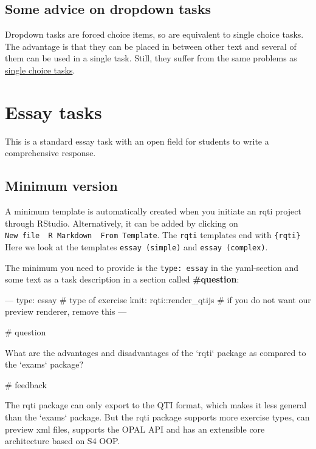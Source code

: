 \documentclass[twoside]{tufte-book}
\newenvironment{Shaded}{}{}
\begin{document}
\section{Some advice on dropdown tasks}\label{some-advice-on-dropdown-tasks}

Dropdown tasks are forced choice items, so are equivalent to single choice tasks. The advantage is that they can be placed in between other text and several of them can be used in a single task. Still, they suffer from the same problems as \href{singlechoice.html}{single choice tasks}.

\chapter{Essay tasks}\label{essay-tasks}

This is a standard essay task with an open field for students to write a comprehensive response.

\section{Minimum version}\label{minimum-version-4}

A minimum template is automatically created when you initiate an rqti project through RStudio. Alternatively, it can be added by clicking on \texttt{New\ file\ \textrightarrow{}\ R\ Markdown\ \textrightarrow{}\ From\ Template}. The \texttt{rqti} templates end with \texttt{\{rqti\}} Here we look at the templates \texttt{essay\ (simple)} and \texttt{essay\ (complex)}.

The minimum you need to provide is the \texttt{type:\ essay} in the yaml-section and some text as a task description in a section called \textbf{\#question}:

\begin{Shaded}
\begin{Highlighting}
---
type: essay # type of exercise
knit: rqti::render_qtijs # if you do not want our preview renderer, remove this
---

# question

What are the advantages and disadvantages of the `rqti` package as compared to
the `exams` package?

# feedback

The rqti package can only export to the QTI format, which makes it less general
than the `exams` package. But the rqti package supports more exercise types, can
preview xml files, supports the OPAL API and has an extensible core architecture
based on S4 OOP.
\end{Highlighting}
\end{Shaded}
\end{document}
